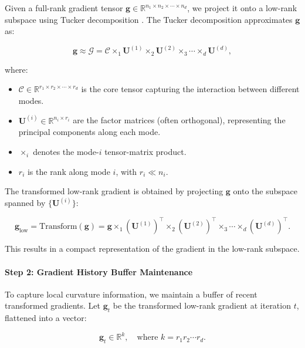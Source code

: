 % 
% 

Given a full-rank gradient tensor $\mathbf{g} \in \mathbb{R}^{n_1 \times n_2 \times \cdots \times n_d}$, we project it onto a low-rank subspace using Tucker decomposition \citep{tuckerMathematicalNotesThree1966}. The Tucker decomposition approximates $\mathbf{g}$ as:

\[
\mathbf{g} \approx \mathcal{G} = \mathcal{C} \times_1 \mathbf{U}^{(1)} \times_2 \mathbf{U}^{(2)} \times_3 \cdots \times_d \mathbf{U}^{(d)},
\]

where:

\begin{itemize}
    \item $\mathcal{C} \in \mathbb{R}^{r_1 \times r_2 \times \cdots \times r_d}$ is the core tensor capturing the interaction between different modes.
    \item $\mathbf{U}^{(i)} \in \mathbb{R}^{n_i \times r_i}$ are the factor matrices (often orthogonal), representing the principal components along each mode.
    \item $\times_i$ denotes the mode-$i$ tensor-matrix product.
    \item $r_i$ is the rank along mode $i$, with $r_i \ll n_i$.
\end{itemize}

The transformed low-rank gradient is obtained by projecting $\mathbf{g}$ onto the subspace spanned by $\{\mathbf{U}^{(i)}\}$:

\[
\mathbf{g}_{\text{low}} = \text{Transform}(\mathbf{g}) = \mathbf{g} \times_1 (\mathbf{U}^{(1)})^\top \times_2 (\mathbf{U}^{(2)})^\top \times_3 \cdots \times_d (\mathbf{U}^{(d)})^\top.
\]

This results in a compact representation of the gradient in the low-rank subspace.

\paragraph{Step 2: Gradient History Buffer Maintenance}



To capture local curvature information, we maintain a buffer of recent transformed gradients. Let $\mathbf{g}_t$ be the transformed low-rank gradient at iteration $t$, flattened into a vector:

\[
\mathbf{g}_t \in \mathbb{R}^{k}, \quad \text{where } k = r_1 r_2 \cdots r_d.
\]

